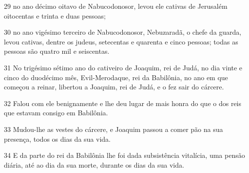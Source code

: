 \par 29 no ano décimo oitavo de Nabucodonosor, levou ele cativas de Jerusalém oitocentas e trinta e duas pessoas;
\par 30 no ano vigésimo terceiro de Nabucodonosor, Nebuzaradã, o chefe da guarda, levou cativas, dentre os judeus, setecentas e quarenta e cinco pessoas; todas as pessoas são quatro mil e seiscentas.
\par 31 No trigésimo sétimo ano do cativeiro de Joaquim, rei de Judá, no dia vinte e cinco do duodécimo mês, Evil-Merodaque, rei da Babilônia, no ano em que começou a reinar, libertou a Joaquim, rei de Judá, e o fez sair do cárcere.
\par 32 Falou com ele benignamente e lhe deu lugar de mais honra do que o dos reis que estavam consigo em Babilônia.
\par 33 Mudou-lhe as vestes do cárcere, e Joaquim passou a comer pão na sua presença, todos os dias da sua vida.
\par 34 E da parte do rei da Babilônia lhe foi dada subsistência vitalícia, uma pensão diária, até ao dia da sua morte, durante os dias da sua vida.


